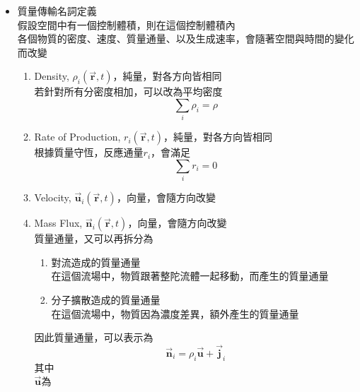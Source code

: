 \documentclass[../main.tex]{subfiles}
\begin{document}
\begin{itemize}
\begin{enumerate}
\begin{itemize}
    \end{itemize}
    \item Mass convection:\\
    當介質時，物質會跟著介質一起流動，而產生質量傳送\\
    會類似於熱傳導中的對流
  \end{enumerate}
  \item 質量傳輸名詞定義\\
    假設空間中有一個控制體積，則在這個控制體積內\\
    各個物質的密度、速度、質量通量、以及生成速率，會隨著空間與時間的變化而改變
    \begin{enumerate}
      \item Density, $\rho_i(\vec{\bm r}, t)$，純量，對各方向皆相同\\
        若針對所有分密度相加，可以改為平均密度
        \begin{equation}
          \sum_i \rho_i = \rho
        \end{equation}
      \item Rate of Production, $r_i(\vec{\bm r}, t)$，純量，對各方向皆相同\\
        根據質量守恆，反應通量$r_i$，會滿足
        \begin{equation}
          \boxed{\sum_i r_i=0}
        \end{equation}
      \item Velocity, $\vec{\bm u}_i(\vec{\bm r}, t)$，向量，會隨方向改變
      \item Mass Flux, $\vec{\bm n}_i (\vec{\bm r}, t)$，向量，會隨方向改變\\
      質量通量，又可以再拆分為
      \begin{enumerate}
        \item 對流造成的質量通量\\
          在這個流場中，物質跟著整陀流體一起移動，而產生的質量通量
        \item 分子擴散造成的質量通量\\
          在這個流場中，物質因為濃度差異，額外產生的質量通量
      \end{enumerate}
      因此質量通量，可以表示為
      \begin{equation}
        \boxed{\vec{\bm n}_i = \rho_i \vec{\bm u} + \vec{\bm j}_i} \label{eq:mass_flux_decomposition} 
      \end{equation}
      其中\\
      $\vec{\bm u}$為\\

\end{enumerate}
\end{itemize}
\end{document}
